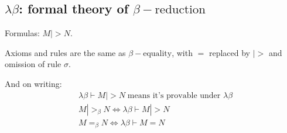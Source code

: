 \documentclass{article}
\begin{document}
\subsection*{$\lambda\beta$: formal theory of $\beta\!-\!\text{reduction}$}

Formulas: $M|>N$.

Axioms and rules are the same as $\beta\!-\!\text{equality}$,
with $=$ replaced by $|>$ and omission of rule $\sigma$.

And on writing:
$$
\begin{aligned}
    & \lambda\beta \vdash M|>N \;\text{means it's provable under }\lambda\beta \\
    & M |>_\beta N \iff \lambda\beta \vdash M|>N \\
    & M =_\beta N \iff \lambda\beta \vdash M=N \\
\end{aligned}
$$
\end{document}

